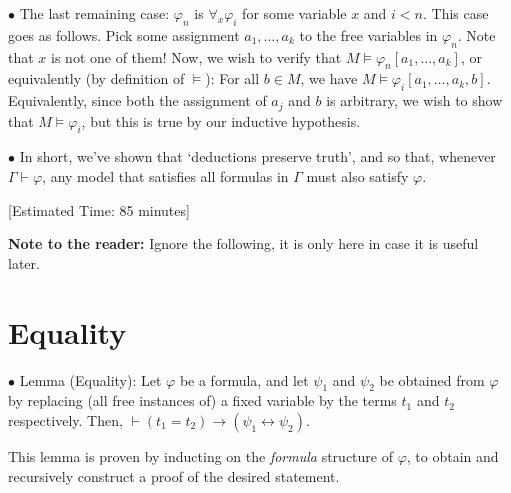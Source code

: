 \documentclass{article}
\newcommand\point[1]{\noindent \hspace{\labelsep} $\bullet$ #1 \smallskip}
\newcommand\timestamp[1]{\noindent \hspace{\labelsep} [Estimated Time: #1] \smallskip}
\begin{document}
\point{The last remaining case: $\varphi_n$ is $\forall_x \varphi_i$ for some variable $x$ and $i < n$. This case goes as follows. Pick some assignment $a_1, \dots, a_k$ to the free variables in $\varphi_n$. Note that $x$ is not one of them! Now, we wish to verify that $M \vDash \varphi_n[a_1, \dots, a_k]$, or equivalently (by definition of $\vDash$): For all $b \in M$, we have $M \vDash \varphi_i[a_1, \dots, a_k, b]$. Equivalently, since both the assignment of $a_j$ and $b$ is arbitrary, we wish to show that $M \vDash \varphi_i$, but this is true by our inductive hypothesis.}

\point{In short, we've shown that `deductions preserve truth', and so that, whenever $\Gamma \vdash \varphi$, any model that satisfies all formulas in $\Gamma$ must also satisfy $\varphi$.}

\timestamp{85 minutes}

\textbf{Note to the reader:} Ignore the following, it is only here in case it is useful later.

\section{Equality}

\point{Lemma (Equality): Let $\varphi$ be a formula, and let $\psi_1$ and $\psi_2$ be obtained from $\varphi$ by replacing (all free instances of) a fixed variable by the terms $t_1$ and $t_2$ respectively. Then, $\vdash (t_1 = t_2) \rightarrow (\psi_1 \leftrightarrow \psi_2)$.

This lemma is proven by inducting on the \emph{formula} structure of $\varphi$, to obtain and recursively construct a proof of the desired statement.}
\end{document}
